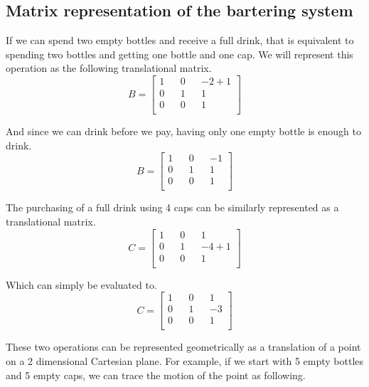 \documentclass[letterpaper, 12pt]{article}
\begin{document}
\subsection{Matrix representation of the bartering system}
\par If we can spend two empty bottles and receive a full drink, that is equivalent to spending two bottles and getting one bottle and one cap.
We will represent this operation as the following translational matrix.
\[
    B=
    \begin{bmatrix}
        1 && 0 && -2 + 1\\
        0 && 1 &&  1\\
        0 && 0 &&  1\\
    \end{bmatrix}
\]
\par And since we can drink before we pay, having only one empty bottle is enough to drink.
\[
    B=
    \begin{bmatrix}
        1 && 0 && -1\\
        0 && 1 &&  1\\
        0 && 0 &&  1\\
    \end{bmatrix}
\]
\par The purchasing of a full drink using 4 caps can be similarly represented as a translational matrix.
\[
    C=
    \begin{bmatrix}
        1 && 0 &&  1\\
        0 && 1 && -4 + 1\\
        0 && 0 &&  1\\
    \end{bmatrix}
\]
\par Which can simply be evaluated to.
\[
    C=
    \begin{bmatrix}
        1 && 0 &&  1\\
        0 && 1 && -3\\
        0 && 0 &&  1\\
    \end{bmatrix}
\]
\par These two operations can be represented geometrically as a translation of a point on a 2 dimensional Cartesian plane.
For example, if we start with 5 empty bottles and 5 empty caps, we can trace the motion of the point as following.
\end{document}
